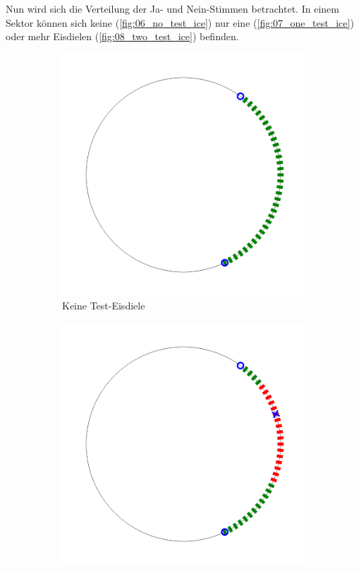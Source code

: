 \documentclass[a4paper,10pt,ngerman]{scrartcl}
\newcommand{\imageWidth}{0.3\linewidth}
\begin{document}
\medskip
Nun wird sich die Verteilung der Ja- und Nein-Stimmen betrachtet.
In einem Sektor können sich keine (\autoref{fig:06_no_test_ice}) nur eine (\autoref{fig:07_one_test_ice}) oder mehr Eisdielen (\autoref{fig:08_two_test_ice}) befinden.
\begin{figure}[h!]
    \centering
    \caption{Test-Eisdielen Anordnung im Sektor}
    \begin{subfigure}[t]{\imageWidth}
        \includegraphics[width=\linewidth]{06_no_test_ice.png}
        \caption{Keine Test-Eisdiele}
        \label{fig:06_no_test_ice}
    \end{subfigure}
    \begin{subfigure}[t]{\imageWidth}
        \includegraphics[width=\linewidth]{07_one_test_ice.png}

\end{subfigure}
\end{figure}
\end{document}
